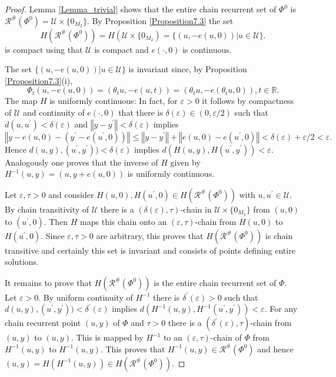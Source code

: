\documentclass{siamltex}%
\begin{document}
\begin{proof}
Lemma \ref{Lemma_trivial} shows that the entire chain recurrent set of
$\Phi^{0}$ is $\mathcal{R}^{\#}(\Phi^{0})=\mathcal{U}\times\{0_{M_{2}}\}$. By
Proposition \ref{Proposition7.3} the set%
\[
H(\mathcal{R}^{\#}(\Phi^{0}))=H(\mathcal{U}\times\{0_{M_{2}}%
)=\{(u,-e(u,0))\left\vert u\in\mathcal{U}\right.  \}.
\]
is compact using that $\mathcal{U}$ is compact and $e(\cdot,0)$ is continuous.

The set $\{(u,-e(u,0))\left\vert u\in\mathcal{U}\right.  \}$ is invariant
since, by Proposition \ref{Proposition7.3}(i),%
\[
\Phi_{t}(u,-e(u,0))=(\theta_{t}u,-e(u,t))=(\theta_{t}u,-e(\theta_{t}%
u,0)),t\in\mathbb{R}.
\]
The map $H$ is uniformly continuous: In fact, for $\varepsilon>0$ it follows
by compactness of $\mathcal{U}$ and continuity of $e(\cdot,0)$ that there is
$\delta(\varepsilon)\in(0,\varepsilon/2)$ such that $d(u,u^{\prime}%
)<\delta(\varepsilon)$ and $\left\Vert y-y^{\prime}\right\Vert <\delta
(\varepsilon)$ implies
\[
\left\Vert y-e(u,0)-\left(  y^{\prime}-e(u^{\prime},0)\right)  \right\Vert
\leq\left\Vert y-y^{\prime}\right\Vert +\left\Vert e(u,0)-e(u^{\prime
},0)\right\Vert <\delta(\varepsilon)+\varepsilon/2<\varepsilon.
\]
Hence $d(u,y),(u^{\prime},y^{\prime}))<\delta(\varepsilon)$ implies
$d(H(u,y),H(u^{\prime},y^{\prime}))<\varepsilon$. Analogously one proves that
the inverse of $H$ given by $H^{-1}(u,y)=(u,y+e(u,0))$ is uniformly continuous.

Let $\varepsilon,\tau>0$ and consider $H(u,0),H(u^{\prime},0)\in
H(\mathcal{R}^{\#}(\Phi^{0}))$ with $u,u^{\prime}\in\mathcal{U}$. By chain
transitivity of $\mathcal{U}$ there is a $(\delta(\varepsilon),\tau)$-chain in
$\mathcal{U}\times\{0_{M_{2}}\}$ from $(u,0)$ to $(u^{\prime},0)$. Then $H$
maps this chain onto an $(\varepsilon,\tau)$-chain from $H(u,0)$ to
$H(u^{\prime},0)$. Since $\varepsilon,\tau>0$ are arbitrary, this proves that
$H(\mathcal{R}^{\#}(\Phi^{0}))$ is chain transitive and certainly this set is
invariant and consists of points defining entire solutions.

It remains to prove that $H(\mathcal{R}^{\#}(\Phi^{0}))$ is the entire chain
recurrent set of $\Phi$. Let $\varepsilon>0$. By uniform continuity of
$H^{-1}$ there is $\delta^{\prime}(\varepsilon)>0$ such that
$d(u,y),(u^{\prime},y^{\prime}))<\delta^{\prime}(\varepsilon)$ implies
$d(H^{-1}(u,y),H^{-1}(u^{\prime},y^{\prime}))<\varepsilon$. For any chain
recurrent point $(u,y)$ of $\Phi$ and $\tau>0$ there is a $(\delta^{\prime
}(\varepsilon),\tau)$-chain from $(u,y)$ to $(u,y)$. This is mapped by
$H^{-1}$ to an $(\varepsilon,\tau)$-chain of $\Phi$ from $H^{-1}(u,y)$ to
$H^{-1}(u,y)$. This proves that $H^{-1}(u,y)\in\mathcal{R}^{\#}(\Phi^{0})$ and
hence $(u,y)=H(H^{-1}(u,y))\in H(\mathcal{R}^{\#}(\Phi^{0}))$.
\end{proof}
\end{document}
